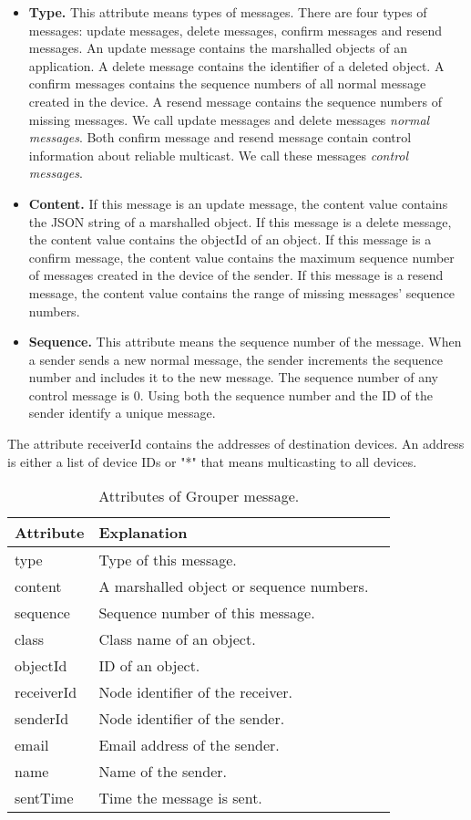 \begin{itemize}
	\setlength{\itemsep}{1pt}
	\setlength{\parskip}{0pt}
	\setlength{\parsep}{0pt}
	\item \textbf{Type.}
	This attribute means types of messages.
	There are four types of messages: update messages, delete messages, confirm messages and resend messages.
	An update message contains the marshalled objects of an application.
	A delete message contains the identifier of a deleted object.
	A confirm messages contains the sequence numbers of all normal message created in the device.
	A resend message contains the sequence numbers of missing messages.
	We call update messages and delete messages \emph{normal messages}. 
	Both confirm message and resend message contain control information about reliable multicast. 
	We call these messages \emph{control messages}.
	\item \textbf{Content.} 
	If this message is an update message, the content value contains the JSON string of a marshalled object.
	If this message is a delete message, the content value contains the objectId of an object.
	If this message is a confirm message, the content value contains the maximum sequence number of messages created in the device of the sender.
	If this message is a resend message, the content value contains the range of missing messages' sequence numbers.
	\item \textbf{Sequence.}
	This attribute means the sequence number of the message.
	When a sender sends a new normal message, the sender increments the sequence number and includes it to the new message.
	The sequence number of any control message is 0.
	Using both the sequence number and the ID of the sender identify a unique message.
\end{itemize}

The attribute receiverId contains the addresses of destination devices.
An address is either a list of device IDs or "*" that means multicasting to all devices.

\begin{table}[t]
	\centering
	\caption{Attributes of Grouper message.}
	\label{my-label}
	\begin{tabular}{lll}
		\hline
		\textbf{Attribute} & \textbf{Explanation} \\ \hline
		type & Type of this message. \\
		content & A marshalled object or sequence numbers. \\
		sequence & Sequence number of this message. \\
		class & Class name of an object. \\
		objectId & ID of an object. \\
		receiverId & Node identifier of the receiver. \\
		senderId & Node identifier of the sender. \\
		email & Email address of the sender. \\
		name & Name of the sender. \\
		sentTime & Time the message is sent. \\
		\hline
	\end{tabular}
\end{table}

